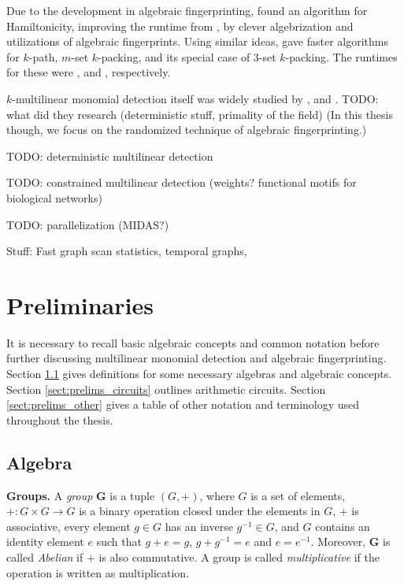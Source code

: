 Due to the development in algebraic fingerprinting, 
\citeauthor{Björklund14} \cite{Björklund14} found an  algorithm for 
Hamiltonicity, improving the runtime from  \cite{Bellman62, HelKar62}, 
by clever algebrization and utilizations of algebraic fingerprints. Using similar 
ideas, \citeauthor{Björklund17} \cite{Björklund17} gave faster algorithms for 
$k$-path, $m$-set $k$-packing, and its special case of 3-set $k$-packing. 
The runtimes for these were ,  and , respectively.

$k$-multilinear monomial detection itself was widely studied by 
\citeauthor{Chen07} \cite{Chen07, Chen11a}, \citeauthor{Chen13a} \cite{Chen13a, Chen11b} 
and \citeauthor{Chen13b} \cite{Chen13b}. TODO: what did they research (deterministic stuff, primality of the field) 
(In this thesis though, we focus on the randomized technique of algebraic fingerprinting.)

TODO: deterministic multilinear detection

TODO: constrained multilinear detection (weights? functional motifs for biological networks)

TODO: parallelization (MIDAS?)

Stuff: Fast graph scan statistics, temporal graphs, 

\section{Preliminaries}
\label{sect:prelims}

It is necessary to recall basic algebraic concepts and common notation 
before further discussing multilinear monomial detection and algebraic fingerprinting. 
Section \ref{sect:prelims_algebra} gives definitions for some necessary algebras 
and algebraic concepts. Section \ref{sect:prelims_circuits} outlines arithmetic circuits. 
Section \ref{sect:prelims_other} gives a table of other notation and terminology used 
throughout the thesis.

\subsection{Algebra} 
\label{sect:prelims_algebra}

\textbf{Groups.} A \emph{group} $\mathbf G$
is a tuple $(G, +)$, where $G$ is a set of elements, 
$+ \colon G \times G \to G$ 
is a binary operation closed under 
the elements in $G$, $+$ is associative, every element $g \in G$ 
has an inverse $g^{-1}\in G$, and $G$ contains 
an identity element $e$ such that $g + e = g$, $g + g^{-1} = e$ and $e = e^{-1}$. 
Moreover, $\mathbf G$ is called \emph{Abelian} if 
$+$ is also commutative. A group is called \emph{multiplicative} if the operation 
is written as multiplication.

